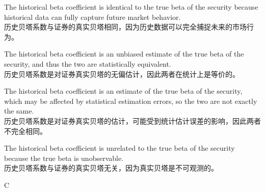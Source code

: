 \documentclass{article}
\begin{document}
        \begin{choices}
            \item The historical beta coefficient is identical to the true beta of the security because historical data can fully capture future market behavior.  
            \\
            历史贝塔系数与证券的真实贝塔相同，因为历史数据可以完全捕捉未来的市场行为。
            \item The historical beta coefficient is an unbiased estimate of the true beta of the security, and thus the two are statistically equivalent.  
            \\
            历史贝塔系数是对证券真实贝塔的无偏估计，因此两者在统计上是等价的。
            \item The historical beta coefficient is an estimate of the true beta of the security, which may be affected by statistical estimation errors, so the two are not exactly the same.  
            \\
            历史贝塔系数是对证券真实贝塔的估计，可能受到统计估计误差的影响，因此两者不完全相同。
            \item The historical beta coefficient is unrelated to the true beta of the security because the true beta is unobservable.  
            \\
            历史贝塔系数与证券的真实贝塔无关，因为真实贝塔是不可观测的。
        \end{choices}
        
        \begin{correctanswer}
        C
        \end{correctanswer}
        
\end{document}
